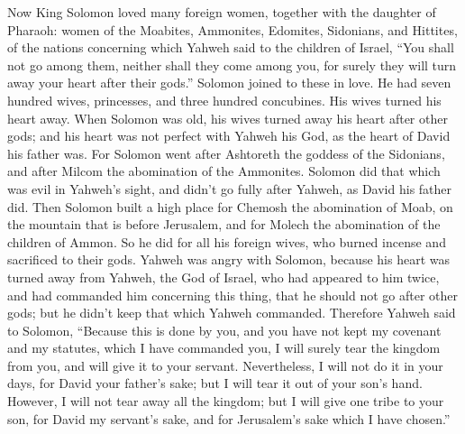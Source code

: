 \begin{paracol}{2}
\begin{otherlanguage}{english}
 Now King Solomon loved many foreign women, together with
the daughter of Pharaoh: women of the Moabites, Ammonites, Edomites,
Sidonians, and Hittites,  of the nations concerning which
Yahweh said to the children of Israel, ``You shall not go among them,
neither shall they come among you, for surely they will turn away your
heart after their gods.'' Solomon joined to these in love.
 He had seven hundred wives, princesses, and three hundred
concubines. His wives turned his heart away.  When Solomon
was old, his wives turned away his heart after other gods; and his heart
was not perfect with Yahweh his God, as the heart of David his father
was.  For Solomon went after Ashtoreth the goddess of the
Sidonians, and after Milcom the abomination of the Ammonites.
 Solomon did that which was evil in Yahweh's sight, and
didn't go fully after Yahweh, as David his father did. 
Then Solomon built a high place for Chemosh the abomination of Moab, on
the mountain that is before Jerusalem, and for Molech the abomination of
the children of Ammon.  So he did for all his foreign
wives, who burned incense and sacrificed to their gods. 
Yahweh was angry with Solomon, because his heart was turned away from
Yahweh, the God of Israel, who had appeared to him twice,
 and had commanded him concerning this thing, that he
should not go after other gods; but he didn't keep that which Yahweh
commanded.  Therefore Yahweh said to Solomon, ``Because
this is done by you, and you have not kept my covenant and my statutes,
which I have commanded you, I will surely tear the kingdom from you, and
will give it to your servant.  Nevertheless, I will not
do it in your days, for David your father's sake; but I will tear it out
of your son's hand.  However, I will not tear away all
the kingdom; but I will give one tribe to your son, for David my
servant's sake, and for Jerusalem's sake which I have chosen.''


\end{otherlanguage}
\end{paracol}
